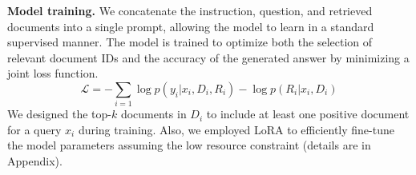 \noindent\textbf{Model training.}
We concatenate the instruction, question, and retrieved documents into a single prompt, allowing the model to learn in a standard supervised manner. The model is trained to optimize both the selection of relevant document IDs and the accuracy of the generated answer by minimizing a joint loss function. 
\begin{equation}
\label{eq2} 
    \mathcal{L} = - \sum_{i=1} \log p(y_i | x_i, D_i, R_i) - \log p(R_i | x_i, D_i)
\end{equation}
We designed the top-$k$ documents in $D_i$ to include at least one positive document for a query $x_i$ during training. Also, we employed LoRA to efficiently fine-tune the model parameters assuming the low resource constraint (details are in Appendix).


